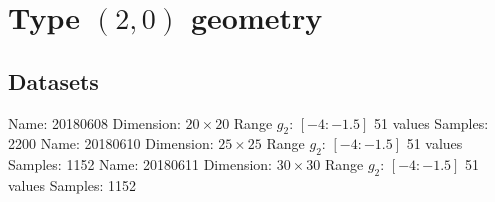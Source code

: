 \documentclass[12pt,a4paper]{article}
\begin{document}
\section{Type $(2,0)$ geometry}

\subsection{Datasets}
Name: 20180608\newline
Dimension: $20 \times 20$\newline
Range $g_2$: $[-4:-1.5]$ 51 values\newline
Samples: 2200\newline
\newline
Name: 20180610\newline
Dimension: $25 \times 25$\newline
Range $g_2$: $[-4:-1.5]$ 51 values\newline
Samples: 1152\newline
\newline
Name: 20180611\newline
Dimension: $30 \times 30$\newline
Range $g_2$: $[-4:-1.5]$ 51 values\newline
Samples: 1152\newline
\end{document}
